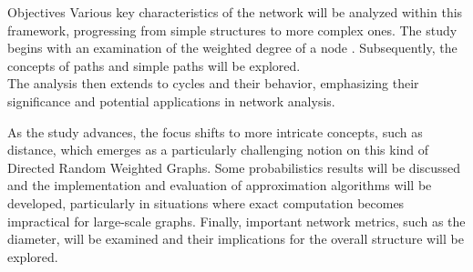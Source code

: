 \begin{projsection}{Objectives}
	Various key characteristics of the network will be analyzed within this framework, progressing from simple structures to more complex ones.
	The study begins with an examination of the weighted degree of a node \cite{gonzalez2010an}. Subsequently, the concepts of paths and simple paths will be explored.\\
	The analysis then extends to cycles and their behavior, emphasizing their significance and potential applications in network analysis.
	
	As the study advances, the focus shifts to more intricate concepts, such as distance, which emerges as a particularly challenging notion on this kind of Directed Random Weighted Graphs.
	Some probabilistics results will be discussed and the implementation and evaluation of approximation algorithms will be developed, particularly in situations where exact computation becomes impractical for large-scale graphs.
	Finally, important network metrics, such as the diameter, will be examined and their implications for the overall structure will be explored.
\end{projsection}